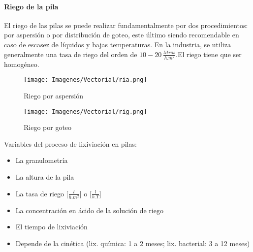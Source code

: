 \paragraph{Riego de la pila}
El riego de las pilas se puede realizar fundamentalmente por dos procedimientos: por aspersi\'on o por distribuci\'on de goteo, este \'ultimo siendo recomendable en caso de escasez de l\'iquidos y bajas temperaturas. En la industria, se utiliza generalmente una tasa de riego del orden de $10-20\:\frac{litros}{h.m^2} $.El riego tiene que ser homog\'eneo.

\begin{figure}[H]
 \centering
 \texttt{[image: Imagenes/Vectorial/ria.png]}
 \caption{Riego por aspersi\'on}
 \label{fig:ria}
\end{figure}

\begin{figure}[H]
 \centering
 \texttt{[image: Imagenes/Vectorial/rig.png]}
 \caption{Riego por goteo}
 \label{fig:rig}
\end{figure}

Variables del proceso de lixiviaci\'on en pilas:
\begin{itemize}
 \item La granulometr\'ia
 \item La altura de la pila
 \item La tasa de riego [$\frac{l}{h.m^2}$] o [$\frac{l}{h.T}$]
 \item La concentraci\'on en \'acido de la soluci\'on de riego
 \item El tiempo de lixiviaci\'on
 \item Depende de la cin\'etica (lix. qu\'imica: 1 a 2 meses; lix. bacterial: 3 a 12 meses)
\end{itemize}

